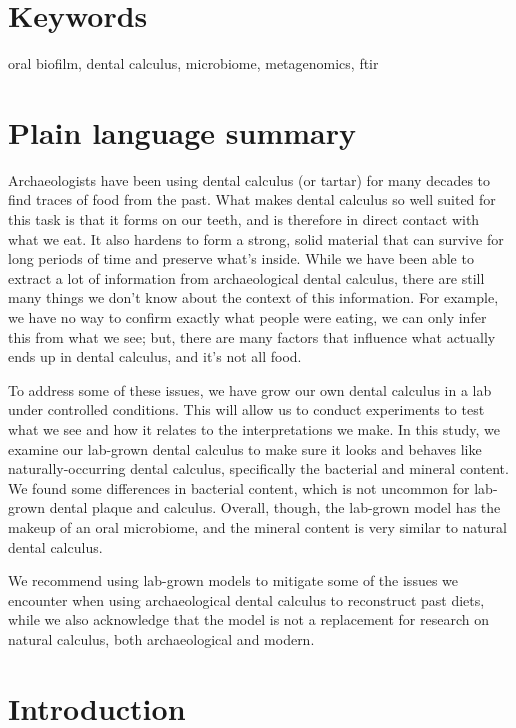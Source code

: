 \documentclass[10pt,a4paper]{article}
\begin{document}
\section*{\color{OREblue}Keywords}

oral biofilm, dental calculus, microbiome, metagenomics, ftir



\clearpage
\pagestyle{fancy}

\section*{Plain language summary}

Archaeologists have been using dental calculus (or tartar) for many
decades to find traces of food from the past. What makes dental calculus
so well suited for this task is that it forms on our teeth, and is
therefore in direct contact with what we eat. It also hardens to form a
strong, solid material that can survive for long periods of time and
preserve what's inside. While we have been able to extract a lot of
information from archaeological dental calculus, there are still many
things we don't know about the context of this information. For example,
we have no way to confirm exactly what people were eating, we can only
infer this from what we see; but, there are many factors that influence
what actually ends up in dental calculus, and it's not all food.

To address some of these issues, we have grow our own dental calculus in
a lab under controlled conditions. This will allow us to conduct
experiments to test what we see and how it relates to the
interpretations we make. In this study, we examine our lab-grown dental
calculus to make sure it looks and behaves like naturally-occurring
dental calculus, specifically the bacterial and mineral content. We
found some differences in bacterial content, which is not uncommon for
lab-grown dental plaque and calculus. Overall, though, the lab-grown
model has the makeup of an oral microbiome, and the mineral content is
very similar to natural dental calculus.

We recommend using lab-grown models to mitigate some of the issues we
encounter when using archaeological dental calculus to reconstruct past
diets, while we also acknowledge that the model is not a replacement for
research on natural calculus, both archaeological and modern.

\newcommand{\pandocbounded}[1]{#1}

\section{Introduction}\label{introduction}
\end{document}
